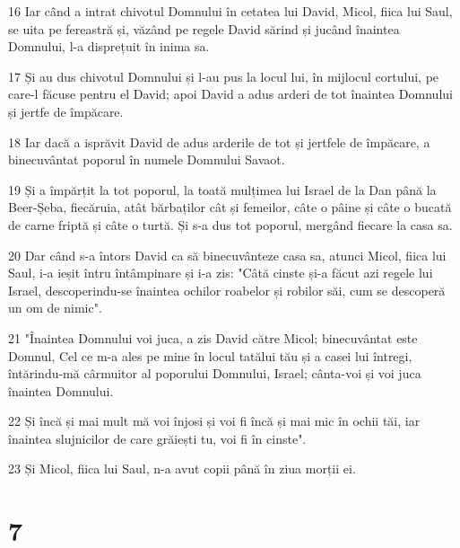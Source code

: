 \par 16 Iar când a intrat chivotul Domnului în cetatea lui David, Micol, fiica lui Saul, se uita pe fereastră și, văzând pe regele David sărind și jucând înaintea Domnului, l-a disprețuit în inima sa.
\par 17 Și au dus chivotul Domnului și l-au pus la locul lui, în mijlocul cortului, pe care-l făcuse pentru el David; apoi David a adus arderi de tot înaintea Domnului și jertfe de împăcare.
\par 18 Iar dacă a isprăvit David de adus arderile de tot și jertfele de împăcare, a binecuvântat poporul în numele Domnului Savaot.
\par 19 Și a împărțit la tot poporul, la toată mulțimea lui Israel de la Dan până la Beer-Șeba, fiecăruia, atât bărbaților cât și femeilor, câte o pâine și câte o bucată de carne friptă și câte o turtă. Și s-a dus tot poporul, mergând fiecare la casa sa.
\par 20 Dar când s-a întors David ca să binecuvânteze casa sa, atunci Micol, fiica lui Saul, i-a ieșit întru întâmpinare și i-a zis: "Câtă cinste și-a făcut azi regele lui Israel, descoperindu-se înaintea ochilor roabelor și robilor săi, cum se descoperă un om de nimic".
\par 21 "Înaintea Domnului voi juca, a zis David către Micol; binecuvântat este Domnul, Cel ce m-a ales pe mine în locul tatălui tău și a casei lui întregi, întărindu-mă cârmuitor al poporului Domnului, Israel; cânta-voi și voi juca înaintea Domnului.
\par 22 Și încă și mai mult mă voi înjosi și voi fi încă și mai mic în ochii tăi, iar înaintea slujnicilor de care grăiești tu, voi fi în cinste".
\par 23 Și Micol, fiica lui Saul, n-a avut copii până în ziua morții ei.

\chapter{7}

